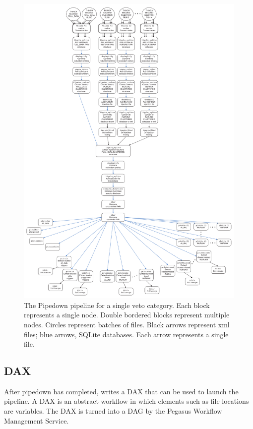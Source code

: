 \begin{figure}[p]
\begin{center}
\includegraphics[width=6in]{figures/PipedownDiagram.pdf}
\end{center}
\caption{
The Pipedown pipeline for a single veto category. Each block represents a single node. Double bordered blocks represent multiple nodes. Circles represent batches of files. Black arrows represent xml files; blue arrows, SQLite databases. Each arrow represents a single file.
}
\label{fig:PipedownDiagram}
\end{figure}

\subsection{DAX}
\label{sec:DAX}

After pipedown has completed, \ihope writes a DAX that can be used to launch the pipeline. A DAX is an abstract workflow in which elements such as file locations are variables. The DAX is turned into a \ac{DAG} by the Pegasus Workflow Management Service.

